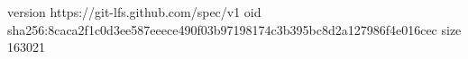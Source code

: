 version https://git-lfs.github.com/spec/v1
oid sha256:8caca2f1c0d3ee587eeece490f03b97198174c3b395bc8d2a127986f4e016cec
size 163021
